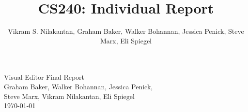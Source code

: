 \documentclass[a4paper]{article}
\title{CS240: Individual Report}
\author{Vikram S. Nilakantan, Graham Baker, Walker Bohannan, Jessica Penick, Steve Marx, Eli Spiegel}
\begin{document}
\begin{titlepage}
\vspace*{\fill} %
\begin{center}
{\Huge Visual Editor Final Report}\\ [0.5cm] 
{\Large Graham Baker, Walker Bohannan, Jessica Penick, \\Steve Marx, Vikram Nilakantan, Eli Spiegel}\\[0.4cm]
\today %
\end{center}
\vspace*{\fill}
\end{titlepage}
\end{document}

